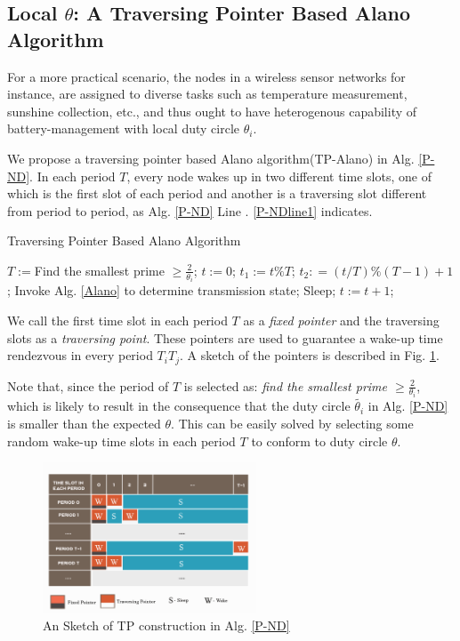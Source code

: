 


\subsection{Local $\theta$: A Traversing Pointer Based Alano Algorithm}


For a more practical scenario, the nodes in a wireless sensor networks 
for instance, are assigned to diverse tasks such as temperature measurement,
sunshine collection, etc., and thus ought to have heterogenous capability of
battery-management with local duty circle $\theta_i$.

We propose a traversing pointer based Alano algorithm(TP-Alano) in Alg. \ref{P-ND}.
In each period $T$, every node wakes up in two different time slots, one of which is the
first slot of each period and another is a traversing slot different from period to period, 
as Alg. \ref{P-ND} Line . \ref{P-NDline1} indicates. 

\begin{algorithm}
\caption{Traversing Pointer Based Alano Algorithm}
\label{P-ND}
\begin{algorithmic}[1]
\STATE $T := $Find the smallest prime $\geq \frac{2}{\theta_i}$;
\STATE $t := 0$;
	\STATE $t_1 := t \% T$;
	\STATE $t_2 : =( t / T ) \% (T - 1) +1$;\label{P-NDline1}
    		\STATE Invoke Alg. \ref{Alano} to determine transmission state;
	\ELSE
    		\STATE Sleep;
	\ENDIF
	\STATE $t := t + 1$;
\ENDWHILE
\end{algorithmic}
\end{algorithm}

We call the first time slot in each period $T$ as a \emph{fixed pointer} and the traversing
slots as a \emph{traversing point}. These pointers are used to guarantee a wake-up time rendezvous
in every period $T_iT_j$. A sketch of the pointers is described in Fig. \ref{TP}.
 
Note that, since the period of $T$ is selected as: 
\emph{find the smallest prime $\geq \frac{2}{\theta_i}$},
which is likely to result in the consequence that the duty 
circle $\widetilde{\theta_i}$ in Alg. \ref{P-ND} is smaller than the expected
$\theta$. This can be easily solved by selecting some random wake-up time slots 
in each period $T$ to conform to duty circle $\theta$.

\begin{figure}[htb]
\centering
\includegraphics[width=2.5in]{./Figure/TP}
\caption{An Sketch of TP construction in Alg. \ref{P-ND}}
\label{TP}
\end{figure}

